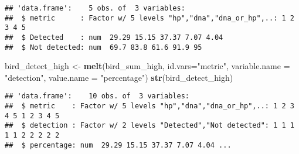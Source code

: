 \documentclass[]{article}
\newenvironment{Shaded}{\begin{snugshade}}{\end{snugshade}}
\newcommand{\KeywordTok}[1]{\textcolor[rgb]{0.13,0.29,0.53}{\textbf{#1}}}
\newcommand{\DataTypeTok}[1]{\textcolor[rgb]{0.13,0.29,0.53}{#1}}
\newcommand{\DecValTok}[1]{\textcolor[rgb]{0.00,0.00,0.81}{#1}}
\newcommand{\StringTok}[1]{\textcolor[rgb]{0.31,0.60,0.02}{#1}}
\newcommand{\CommentTok}[1]{\textcolor[rgb]{0.56,0.35,0.01}{\textit{#1}}}
\newcommand{\OtherTok}[1]{\textcolor[rgb]{0.56,0.35,0.01}{#1}}
\newcommand{\OperatorTok}[1]{\textcolor[rgb]{0.81,0.36,0.00}{\textbf{#1}}}
\newcommand{\NormalTok}[1]{#1}
\begin{document}
\begin{Shaded}
\end{Shaded}

\begin{verbatim}
## 'data.frame':    5 obs. of  3 variables:
##  $ metric      : Factor w/ 5 levels "hp","dna","dna_or_hp",..: 1 2 3 4 5
##  $ Detected    : num  29.29 15.15 37.37 7.07 4.04
##  $ Not detected: num  69.7 83.8 61.6 91.9 95
\end{verbatim}

\begin{Shaded}
\begin{Highlighting}[]
\NormalTok{bird_detect_high <-}\StringTok{ }\KeywordTok{melt}\NormalTok{(bird_sum_high, }\DataTypeTok{id.vars=}\StringTok{"metric"}\NormalTok{, }\DataTypeTok{variable.name =} \StringTok{"detection"}\NormalTok{, }\DataTypeTok{value.name =} \StringTok{"percentage"}\NormalTok{)}
\KeywordTok{str}\NormalTok{(bird_detect_high)}
\end{Highlighting}
\end{Shaded}

\begin{verbatim}
## 'data.frame':    10 obs. of  3 variables:
##  $ metric    : Factor w/ 5 levels "hp","dna","dna_or_hp",..: 1 2 3 4 5 1 2 3 4 5
##  $ detection : Factor w/ 2 levels "Detected","Not detected": 1 1 1 1 1 2 2 2 2 2
##  $ percentage: num  29.29 15.15 37.37 7.07 4.04 ...
\end{verbatim}
\end{document}
